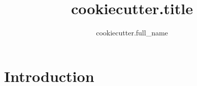 \documentclass[a4paper]{scrartcl}
\title{ {{cookiecutter.title}} }
\author{ {{cookiecutter.full_name}} }
\begin{document}
\maketitle

\section{Introduction} %
\label{sec:introduction}
%

%



\end{document}
